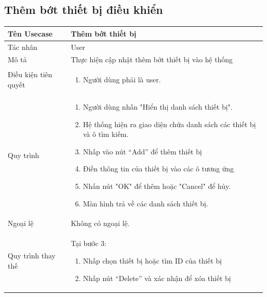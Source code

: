 \subsection{Thêm bớt thiết bị điều khiển}
\begin{center}
	\begin{tabular}{|p{4cm}|p{10cm}|}
		\hline
		Tên Usecase & Thêm bớt thiết bị\\ \hline
		Tác nhân & User \\ \hline
		Mô tả & Thực hiện cập nhật thêm bớt thiết bị vào hệ thống
		\\ \hline
		Điều kiện tiên quyết & \begin{enumerate}
			\item Người dùng phải là user.
		\end{enumerate} \\ \hline
		Quy trình & \begin{enumerate}
			\item Người dùng nhấn "Hiển thị danh sách thiết bị".
			\item Hệ thống hiện ra giao diện chứa danh sách các thiết bị và ô tìm kiếm.
			\item Nhấp vào nút “Add” để thêm thiết bị
			\item Điền thông tin của thiết bị vào các ô tương ứng
			\item Nhấn nút "OK" để thêm hoặc "Cancel" để hủy.
			\item Màn hình trả về các danh sách thiết bị.
		\end{enumerate}\\ \hline
		Ngoại lệ & Không có ngoại lệ. \\ \hline
		Quy trình thay thế & Tại bước 3:
		\begin{enumerate}	
			\item Nhấp chọn thiết bị hoặc tìm ID của thiết bị
			\item Nhấp nút “Delete” và xác nhận để xóa thiết bị
		\end{enumerate}\\ \hline
		
	\end{tabular}
\end{center}

